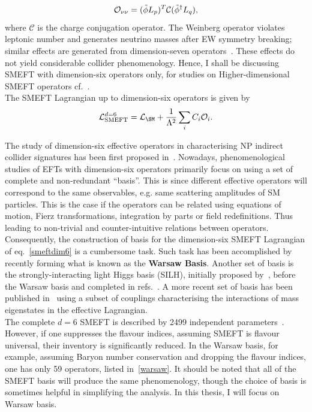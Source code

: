 \begin{equation}
	\mathcal{O}_{\nu \nu} =(\tilde{\phi} L_p)^T {\cal C} (\tilde{\phi}^{\dagger} L_q),
	\label{weinbergoperator}
\end{equation}
where $ \mathcal{C}$ is the charge conjugation operator. The Weinberg operator violates leptonic number and generates neutrino masses after EW symmetry breaking; similar effects are generated from dimension-seven operators~\cite{Lehman:2014jma}. These effects do not yield considerable collider phenomenology. Hence, I shall be discussing SMEFT with dimension-six operators only, for studies on Higher-dimensional SMEFT operators cf.~\cite{Lehman:2014jma,Lehman:2015coa,Henning:2015alf,Aguilar-Saavedra:2010uur}. \\ The SMEFT Lagrangian up to dimension-six operators is given by
\begin{equation}
	\mathcal{L}_{\mathrm{SMEFT}}^{d=6}=\mathcal{L}_{\SM} + \frac{1}{\Lambda^2}\sum_i C_i  {\cal O}_i.
	\label{smeftdim6}
\end{equation}

The study of dimension-six effective operators in characterising NP indirect collider signatures has been first proposed in~\cite{BUCHMULLER1986621,Hagiwara:1993ck}. Nowadays,  phenomenological studies of EFTs with dimension-six operators primarily focus on using a set of complete and non-redundant ``basis''. This is since different effective operators will correspond to the same observables, e.g. same scattering amplitudes of SM particles.  This is the case if the operators can be related using equations of motion, Fierz transformations, integration by parts or field redefinitions. Thus leading to non-trivial and counter-intuitive relations between operators. Consequently, the construction of basis for the dimension-six SMEFT Lagrangian of eq.~\eqref{smeftdim6} is a cumbersome task. Such task has been accomplished by~\cite{Grzadkowski:2010es} recently forming what is known as the \textbf{Warsaw Basis}.  Another set of basis is the strongly-interacting light Higgs basis (SILH), initially proposed by~\cite{Giudice:2007fh}, before the Warsaw basis and completed in refs.~\cite{Contino:2013kra, Elias-Miro:2013eta}. A more recent set of basis has been published in~\cite{Gupta:2014rxa} using a subset of couplings characterising the interactions of mass eigenstates in the effective Lagrangian.\\
The complete $d=6$ SMEFT is described by 2499 independent parameters~\cite{Jenkins:2013zja,Jenkins:2013wua,Alonso:2013hga}. However, if one suppresses the flavour indices, assuming SMEFT is flavour universal, their inventory is significantly reduced. In the Warsaw basis, for example, assuming Baryon number conservation and dropping the flavour indices, one has only 59 operators, listed in~\autoref{warsaw}. It should be noted that all of the SMEFT basis will produce the same phenomenology, though the choice of basis is sometimes helpful in simplifying the analysis. In this thesis, I will focus on Warsaw basis.\\ 
